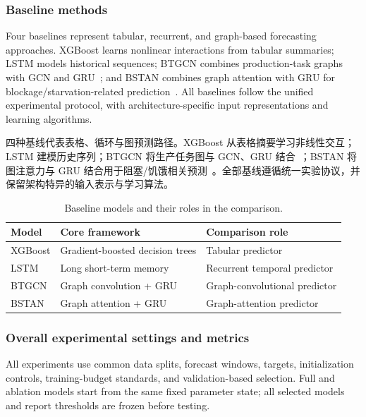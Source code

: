 \documentclass[a4paper,fleqn]{cas-dc}
\newcommand{\zhpara}[1]{%
  \par\begingroup\small\color{black!72}\noindent #1\par\endgroup}
\begin{document}
\subsubsection{Baseline methods}

Four baselines represent tabular, recurrent, and graph-based forecasting approaches. XGBoost learns nonlinear interactions from tabular summaries; LSTM models historical sequences; BTGCN combines production-task graphs with GCN and GRU~\cite{yin2025btgcn}; and BSTAN combines graph attention with GRU for blockage/starvation-related prediction~\cite{lai2023bstan}. All baselines follow the unified experimental protocol, with architecture-specific input representations and learning algorithms.

\zhpara{四种基线代表表格、循环与图预测路径。XGBoost 从表格摘要学习非线性交互；LSTM 建模历史序列；BTGCN 将生产任务图与 GCN、GRU 结合~\cite{yin2025btgcn}；BSTAN 将图注意力与 GRU 结合用于阻塞/饥饿相关预测~\cite{lai2023bstan}。全部基线遵循统一实验协议，并保留架构特异的输入表示与学习算法。}


\begin{table}[pos=!htbp]
\centering
\caption{Baseline models and their roles in the comparison.}
\label{tab:exp-baselines}
\scriptsize
\setlength{\tabcolsep}{4pt}
\renewcommand{\arraystretch}{1.10}
\begin{tabularx}{\columnwidth}{@{}lXX@{}}
\toprule
Model & Core framework & Comparison role \\
\midrule
XGBoost & Gradient-boosted decision trees & Tabular predictor \\
LSTM & Long short-term memory & Recurrent temporal predictor \\
BTGCN & Graph convolution + GRU & Graph-convolutional predictor \\
BSTAN & Graph attention + GRU & Graph-attention predictor \\
\bottomrule
\end{tabularx}
\end{table}

\subsubsection{Overall experimental settings and metrics}

All experiments use common data splits, forecast windows, targets, initialization controls, training-budget standards, and validation-based selection. Full and ablation models start from the same fixed parameter state; all selected models and report thresholds are frozen before testing.
\end{document}

